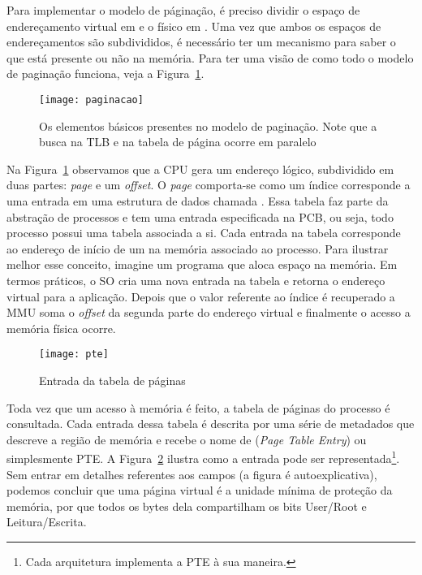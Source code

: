 Para implementar o modelo de páginação, é preciso dividir o espaço de
endereçamento virtual em  e o físico em
. Uma vez que ambos os espaços de endereçamentos são
subdivididos, é necessário ter um mecanismo para saber o que está presente ou
não na memória. Para ter uma visão de como todo o modelo de paginação funciona,
veja a Figura~\ref{fig:paginacao}.

\begin{figure}[!h]
  \centering
  \texttt{[image: paginacao]} 
  \caption{Os elementos básicos presentes no modelo de paginação. Note que a busca na TLB e na tabela de página ocorre em paralelo}
  \label{fig:paginacao}
\end{figure}

Na Figura~\ref{fig:paginacao} observamos que a CPU gera um endereço lógico,
subdividido em duas partes: \textit{page} e um \textit{offset}. O \emph{page}
comporta-se como um índice corresponde a uma entrada em uma estrutura de dados
chamada . Essa tabela faz parte da abstração
de processos e tem uma entrada especificada na PCB, ou seja, todo processo
possui uma tabela associada a si. Cada entrada na tabela corresponde ao
endereço de início de um  na memória associado ao
processo.  Para ilustrar melhor esse conceito, imagine um programa que aloca
espaço na memória. Em termos práticos, o SO cria uma nova entrada na tabela e
retorna o endereço virtual para a aplicação.  Depois que o valor referente ao
índice é recuperado a MMU soma o \textit{offset} da segunda parte do endereço
virtual e finalmente o acesso a memória física ocorre.

\begin{figure}[!h]
  \centering
  \texttt{[image: pte]}
  \caption{Entrada da tabela de páginas}
  \label{fig:pte}
\end{figure}

Toda vez que um acesso à memória é feito, a tabela de páginas do processo é
consultada. Cada entrada dessa tabela é descrita por uma série de metadados que
descreve a região de memória e recebe o nome de  (\textit{Page Table Entry}) ou simplesmente PTE. A
Figura~\ref{fig:pte} ilustra como a entrada pode ser representada\footnote{Cada
arquitetura implementa a PTE à sua maneira.}. Sem entrar em detalhes referentes
aos campos (a figura é autoexplicativa), podemos concluir que uma página
virtual é a unidade mínima de proteção da memória, por que todos os bytes dela
compartilham os bits User/Root e Leitura/Escrita.

